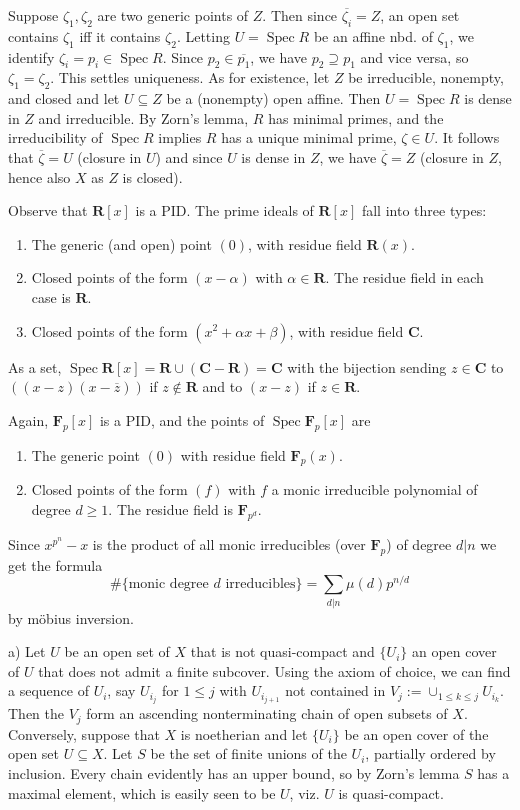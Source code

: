 \documentclass{report}
\newcommand{\R}{\mathbf{R}}
\newcommand{\C}{\mathbf{C}}
\newcommand{\FF}{\mathbf{F}}
\DeclareMathOperator{\Spec}{Spec}
\begin{document}
\bigskip
{}	Suppose $\zeta_1,\zeta_2$ are two generic points of $Z$.  Then since $\overline{\zeta_i}=Z$, an open set contains $\zeta_1$
iff it contains $\zeta_2$.  Letting $U=\Spec R$ be an affine nbd. of $\zeta_1$, we identify $\zeta_i=p_i\in\Spec R$.  
Since $p_2\in\overline{p_1}$, we have $p_2\supseteq p_1$ and vice versa, so $\zeta_1=\zeta_2$.  This settles uniqueness.
As for existence, let $Z$ be irreducible, nonempty, and closed and let $U\subseteq Z$ be a (nonempty) open affine.
Then $U=\Spec R$ is dense in $Z$ and irreducible.  By Zorn's lemma, $R$ has minimal primes, and the irreducibility
of $\Spec R$ implies $R$ has a unique minimal prime, $\zeta\in U$.  It follows that $\overline{\zeta}=U$ (closure in $U$)
and since $U$ is dense in $Z$, we have $\overline{\zeta}=Z$ (closure in $Z$, hence also $X$ as $Z$ is closed).

\bigskip
{}	Observe that $\R[x]$ is a PID.  The prime ideals of $\R[x]$ fall into three types:
\begin{enumerate}
	\item The generic (and open) point $(0)$, with residue field $\R(x)$.
	\item Closed points of the form $(x-\alpha)$ with $\alpha\in\R$.  The residue field in each case is $\R$.
	\item Closed points of the form $(x^2+\alpha x+\beta)$, with residue field $\C$.
\end{enumerate}
As a set, $\Spec \R[x]=\R\cup (\C-\R)=\C$ with the bijection sending $z\in \C$ to $((x-z)(x-\overline{z}))$ if $z\not\in\R$
and to $(x-z)$ if $z\in\R$.

\bigskip
{}	Again, $\FF_p[x]$ is a PID, and the points of $\Spec \FF_p[x]$ are
\begin{enumerate}
	\item	 The generic point $(0)$ with residue field $\FF_p(x)$. 
	\item  Closed points of the form $(f)$ with $f$ a monic irreducible polynomial of degree $d\ge 1$.  The
	residue field is $\FF_{p^d}$. 
\end{enumerate}
Since $x^{p^n}-x$ is the product of all monic irreducibles (over $\FF_p$) of degree $d|n$ we get the formula
$$\#\{\text{monic degree $d$ irreducibles}\}=\sum_{d|n}\mu(d)p^{n/d}$$ by m\"{o}bius inversion.


\bigskip
{}

\bigskip
{}	a)  Let $U$ be an open set of $X$ that is not quasi-compact and $\{U_i\}$ an open cover of $U$
that does not admit a finite subcover.  Using the axiom of choice, we can find a sequence
of $U_i$, say $U_{i_j}$ for $1\le j$ with $U_{i_{j+1}}$ not contained in $V_{j}:=\cup_{1\le k\le j} U_{i_k}$.
Then the $V_j$ form an ascending nonterminating chain of open subsets of $X$.
Conversely, suppose that $X$ is noetherian and let $\{U_i\}$ be an open cover
of the open set $U\subseteq X$.  Let $S$ be the set of finite unions of the $U_i$, partially ordered
by inclusion.  Every chain evidently has an upper bound, so by Zorn's lemma $S$ has a maximal element,
which is easily seen to be $U$, viz. $U$ is quasi-compact.
\end{document}
